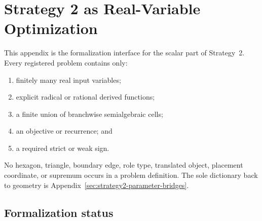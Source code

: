\section{Strategy 2 as Real-Variable Optimization}
\label{sec:strategy2-optimization-problems}

This appendix is the formalization interface for the scalar part of
Strategy~2.  Every registered problem contains only:
\begin{enumerate}
\item finitely many real input variables;
\item explicit radical or rational derived functions;
\item a finite union of branchwise semialgebraic cells;
\item an objective or recurrence; and
\item a required strict or weak sign.
\end{enumerate}
No hexagon, triangle, boundary edge, role type, translated object, placement
coordinate, or supremum occurs in a problem definition.  The sole dictionary
back to geometry is Appendix~\ref{sec:strategy2-parameter-bridges}.








\subsection{Formalization status}


